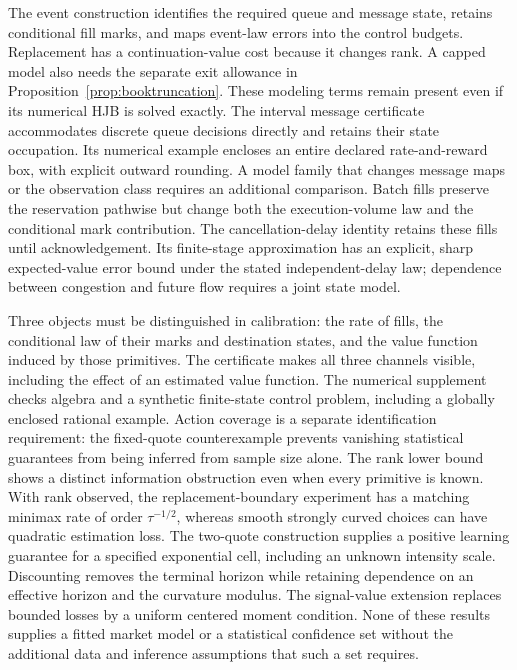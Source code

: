 \documentclass[11pt]{article}
\theoremstyle{plain}
\theoremstyle{definition}
\theoremstyle{remark}
\begin{document}
The event construction identifies the required queue and message
state, retains conditional fill marks, and maps event-law errors into
the control budgets. Replacement has a continuation-value cost because
it changes rank. A capped model also needs the separate exit allowance
in Proposition~\ref{prop:booktruncation}. These modeling terms remain
present even if its numerical HJB is solved exactly.
The interval message certificate accommodates discrete queue decisions
directly and retains their state occupation. Its numerical example
encloses an entire declared rate-and-reward box, with explicit
outward rounding. A model family that changes message maps or
the observation class requires an additional comparison.
Batch fills preserve the reservation pathwise but change both the
execution-volume law and the conditional mark contribution.
The cancellation-delay identity retains these fills until
acknowledgement. Its finite-stage approximation has an explicit,
sharp expected-value error bound under the stated independent-delay
law; dependence between congestion and future flow requires a
joint state model.

Three objects must be distinguished in calibration: the rate of fills,
the conditional law of their marks and destination states, and the value
function induced by those primitives. The certificate makes all three
channels visible, including the effect of an estimated value function.
The numerical supplement checks algebra and a synthetic finite-state
control problem, including a globally enclosed rational example.
Action coverage is a separate identification requirement: the
fixed-quote counterexample prevents vanishing statistical guarantees
from being inferred from sample size alone. The rank lower bound shows a distinct
information obstruction even when every primitive is known.
With rank observed, the replacement-boundary experiment has a
matching minimax rate of order \(\tau^{-1/2}\), whereas smooth
strongly curved choices can have quadratic estimation loss.
The two-quote construction
supplies a positive learning guarantee for a specified exponential cell,
including an unknown intensity scale. Discounting removes the terminal
horizon while retaining dependence on an effective horizon and the
curvature modulus. The signal-value extension replaces bounded losses
by a uniform centered moment condition. None of these results
supplies a fitted market model or a statistical confidence set without
the additional data and inference assumptions that such a set requires.



\end{document}
